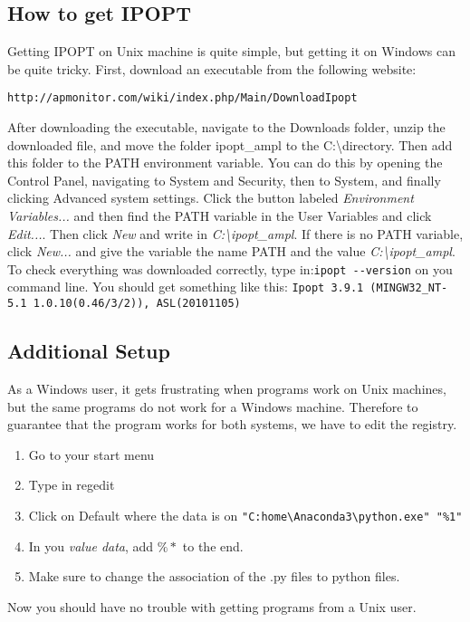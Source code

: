 \documentclass[12pt]{article}
\begin{document}
\subsection{How to get IPOPT}
Getting IPOPT on Unix machine is quite simple, but getting it on Windows can be quite tricky. First, download an executable from the following website:
\begin{verbatim}
http://apmonitor.com/wiki/index.php/Main/DownloadIpopt
\end{verbatim}
After downloading the executable, navigate to the Downloads folder, unzip the downloaded file, and move the folder ipopt\_ampl to the C:\textbackslash directory. Then add this folder to the PATH environment variable. You can do this by opening the Control Panel, navigating to System and Security, then to System, and finally clicking Advanced system settings. Click the button labeled \emph{Environment Variables...} and then find the PATH variable in the User Variables and click \emph{Edit...}. Then click {\it New} and write in \emph{C:\textbackslash ipopt\_ampl}. If there is no PATH variable, click \emph{New...} and give the variable the name PATH  and the value \emph{C:\textbackslash ipopt\_ampl}.\newline
To check everything was downloaded correctly, type in:\newline \verb|ipopt --version| \newline on you command line. You should get something like this:\newline
\verb|Ipopt 3.9.1 (MINGW32_NT-5.1 1.0.10(0.46/3/2)), ASL(20101105)|
 
\subsection{Additional Setup}
As a Windows user, it gets frustrating when programs work on Unix machines, but the same programs do not work for a Windows machine. Therefore to guarantee that the program works for both systems, we have to edit the registry.\newline
\begin{enumerate}
	\item Go to your start menu
	\item Type in regedit
	\item Click on Default where the data is on \verb|"C:home\Anaconda3\python.exe" "%1"|
	\item In you \emph{value data}, add $\%*$ to the end.
	\item Make sure to change the association of the .py files to python files. 
\end{enumerate}
Now you should have no trouble with getting programs from a Unix user.
\end{document}
